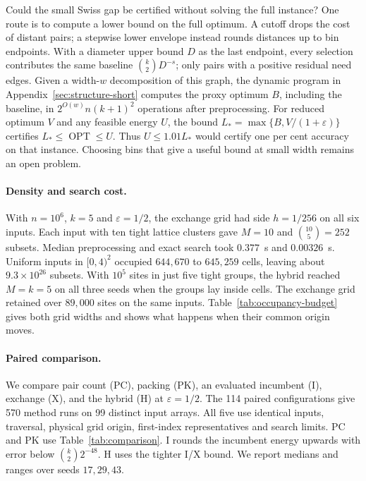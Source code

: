 \documentclass[a4paper,12pt]{article}
\newcommand{\OPT}{\operatorname{OPT}}
\numberwithin{equation}{section}
\begin{document}
Could the small Swiss gap be certified without solving the full instance? One route is to compute
a lower bound on the full optimum. A cutoff drops the cost of distant pairs; a stepwise lower
envelope instead rounds distances up to bin endpoints. With a diameter upper bound $D$ as the last
endpoint, every selection contributes the same baseline $\binom{k}{2}D^{-s}$; only pairs with a
positive residual need edges. Given a width-$w$ decomposition of this graph, the dynamic program
in Appendix~\ref{sec:structure-short} computes the proxy optimum $B$, including the baseline, in
$2^{O(w)}n(k+1)^2$ operations after preprocessing. For reduced optimum $V$ and any feasible energy
$U$, the bound $L_*=\max\{B,V/(1+\varepsilon)\}$ certifies $L_*\le\OPT\le U$. Thus $U\le1.01L_*$
would certify one per cent accuracy on that instance. Choosing bins that give a useful bound at
small width remains an open problem.

\paragraph*{Density and search cost.}
With $n=10^6$, $k=5$ and $\varepsilon=1/2$, the exchange grid had side $h=1/256$ on all six
inputs. Each input with ten tight lattice clusters gave $M=10$ and $\binom{10}{5}=252$ subsets.
Median preprocessing and exact search took $0.377$~s and $0.00326$~s. Uniform inputs in $[0,4)^2$
occupied $644{,}670$ to $645{,}259$ cells, leaving about $9.3\times10^{26}$ subsets. With $10^5$
sites in just five tight groups, the hybrid reached $M=k=5$ on all three seeds when the groups lay
inside cells. The exchange grid retained over $89{,}000$ sites on the same inputs.
Table~\ref{tab:occupancy-budget} gives both grid widths and shows what happens when their common
origin moves.

\paragraph*{Paired comparison.}
We compare pair count (PC), packing (PK), an evaluated incumbent (I), exchange (X), and the hybrid
(H) at $\varepsilon=1/2$. The 114 paired configurations give 570 method runs on 99 distinct input
arrays. All five use identical inputs, traversal, physical grid origin, first-index
representatives and search limits. PC and PK use Table~\ref{tab:comparison}. I rounds the
incumbent energy upwards with error below $\binom{k}{2}2^{-48}$. H uses the tighter I/X bound. We
report medians and ranges over seeds $17,29,43$.
\end{document}
